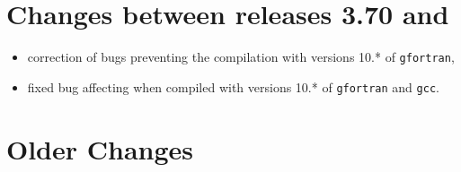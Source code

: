 \documentclass[12pt,twoside]{article}
\begin{document}
\newpage

\section[Changes between releases 3.70 and \hpxversion]{%
Changes between releases 3.70 and \hpxversion} %
\begin{itemize}
\item correction of bugs preventing the compilation with versions 10.* of \texttt{gfortran},
\item fixed bug affecting  when compiled with versions 10.* of {\tt gfortran} and {\tt gcc}.
\end{itemize}


\section[Older Changes]{Older Changes}
\end{document}
